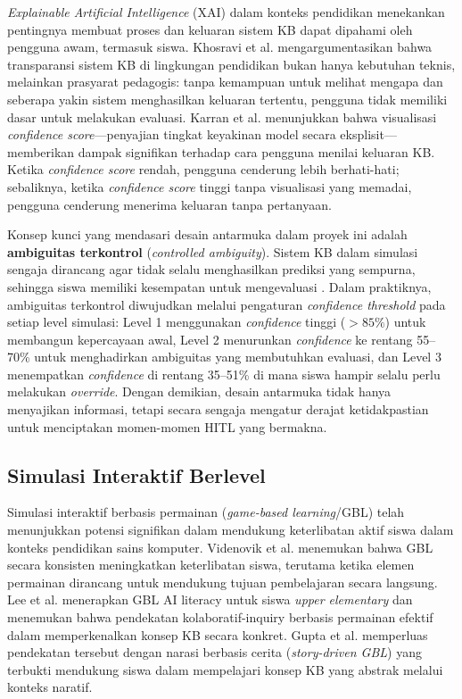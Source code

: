 \documentclass[12pt,a4paper,oneside,openany]{report}
\begin{document}
\textit{Explainable Artificial Intelligence} (XAI) dalam konteks pendidikan menekankan pentingnya membuat proses dan keluaran sistem KB dapat dipahami oleh pengguna awam, termasuk siswa. Khosravi et al. \cite{ref3} mengargumentasikan bahwa transparansi sistem KB di lingkungan pendidikan bukan hanya kebutuhan teknis, melainkan prasyarat pedagogis: tanpa kemampuan untuk melihat mengapa dan seberapa yakin sistem menghasilkan keluaran tertentu, pengguna tidak memiliki dasar untuk melakukan evaluasi. Karran et al. \cite{ref8} menunjukkan bahwa visualisasi \textit{confidence score}---penyajian tingkat keyakinan model secara eksplisit---memberikan dampak signifikan terhadap cara pengguna menilai keluaran KB. Ketika \textit{confidence score} rendah, pengguna cenderung lebih berhati-hati; sebaliknya, ketika \textit{confidence score} tinggi tanpa visualisasi yang memadai, pengguna cenderung menerima keluaran tanpa pertanyaan.

Konsep kunci yang mendasari desain antarmuka dalam proyek ini adalah \textbf{ambiguitas terkontrol} (\textit{controlled ambiguity}). Sistem KB dalam simulasi sengaja dirancang agar tidak selalu menghasilkan prediksi yang sempurna, sehingga siswa memiliki kesempatan untuk mengevaluasi \cite{ref3}. Dalam praktiknya, ambiguitas terkontrol diwujudkan melalui pengaturan \textit{confidence threshold} pada setiap level simulasi: Level 1 menggunakan \textit{confidence} tinggi ($>85\%$) untuk membangun kepercayaan awal, Level 2 menurunkan \textit{confidence} ke rentang 55--70\% untuk menghadirkan ambiguitas yang membutuhkan evaluasi, dan Level 3 menempatkan \textit{confidence} di rentang 35--51\% di mana siswa hampir selalu perlu melakukan \textit{override}. Dengan demikian, desain antarmuka tidak hanya menyajikan informasi, tetapi secara sengaja mengatur derajat ketidakpastian untuk menciptakan momen-momen HITL yang bermakna.

\subsection{Simulasi Interaktif Berlevel}
\label{subsec:simulasi-interaktif}

Simulasi interaktif berbasis permainan (\textit{game-based learning}/GBL) telah menunjukkan potensi signifikan dalam mendukung keterlibatan aktif siswa dalam konteks pendidikan sains komputer. Videnovik et al. \cite{ref6} menemukan bahwa GBL secara konsisten meningkatkan keterlibatan siswa, terutama ketika elemen permainan dirancang untuk mendukung tujuan pembelajaran secara langsung. Lee et al. \cite{ref13} menerapkan GBL AI literacy untuk siswa \textit{upper elementary} dan menemukan bahwa pendekatan kolaboratif-inquiry berbasis permainan efektif dalam memperkenalkan konsep KB secara konkret. Gupta et al. \cite{ref14} memperluas pendekatan tersebut dengan narasi berbasis cerita (\textit{story-driven GBL}) yang terbukti mendukung siswa dalam mempelajari konsep KB yang abstrak melalui konteks naratif.
\end{document}
